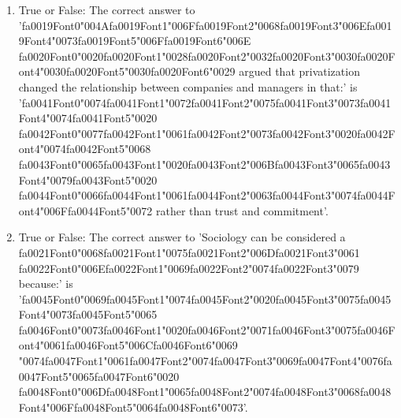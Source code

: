 \documentclass[12pt]{article}
\begin{document}
\begin{enumerate}[label=\arabic*.]
\item True or False: The correct answer to '{\csname fa0019Font0\endcsname\char"004A}{\csname fa0019Font1\endcsname\char"006F}{\csname fa0019Font2\endcsname\char"0068}{\csname fa0019Font3\endcsname\char"006E}{\csname fa0019Font4\endcsname\char"0073}{\csname fa0019Font5\endcsname\char"006F}{\csname fa0019Font6\endcsname\char"006E} {\csname fa0020Font0\endcsname\char"0020}{\csname fa0020Font1\endcsname\char"0028}{\csname fa0020Font2\endcsname\char"0032}{\csname fa0020Font3\endcsname\char"0030}{\csname fa0020Font4\endcsname\char"0030}{\csname fa0020Font5\endcsname\char"0030}{\csname fa0020Font6\endcsname\char"0029} argued that privatization changed the relationship between companies and managers in that:' is '{\csname fa0041Font0\endcsname\char"0074}{\csname fa0041Font1\endcsname\char"0072}{\csname fa0041Font2\endcsname\char"0075}{\csname fa0041Font3\endcsname\char"0073}{\csname fa0041Font4\endcsname\char"0074}{\csname fa0041Font5\endcsname\char"0020} {\csname fa0042Font0\endcsname\char"0077}{\csname fa0042Font1\endcsname\char"0061}{\csname fa0042Font2\endcsname\char"0073}{\csname fa0042Font3\endcsname\char"0020}{\csname fa0042Font4\endcsname\char"0074}{\csname fa0042Font5\endcsname\char"0068} {\csname fa0043Font0\endcsname\char"0065}{\csname fa0043Font1\endcsname\char"0020}{\csname fa0043Font2\endcsname\char"006B}{\csname fa0043Font3\endcsname\char"0065}{\csname fa0043Font4\endcsname\char"0079}{\csname fa0043Font5\endcsname\char"0020} {\csname fa0044Font0\endcsname\char"0066}{\csname fa0044Font1\endcsname\char"0061}{\csname fa0044Font2\endcsname\char"0063}{\csname fa0044Font3\endcsname\char"0074}{\csname fa0044Font4\endcsname\char"006F}{\csname fa0044Font5\endcsname\char"0072} rather than trust and commitment'.
\item True or False: The correct answer to 'Sociology can be considered a {\csname fa0021Font0\endcsname\char"0068}{\csname fa0021Font1\endcsname\char"0075}{\csname fa0021Font2\endcsname\char"006D}{\csname fa0021Font3\endcsname\char"0061} {\csname fa0022Font0\endcsname\char"006E}{\csname fa0022Font1\endcsname\char"0069}{\csname fa0022Font2\endcsname\char"0074}{\csname fa0022Font3\endcsname\char"0079} because:' is '{\csname fa0045Font0\endcsname\char"0069}{\csname fa0045Font1\endcsname\char"0074}{\csname fa0045Font2\endcsname\char"0020}{\csname fa0045Font3\endcsname\char"0075}{\csname fa0045Font4\endcsname\char"0073}{\csname fa0045Font5\endcsname\char"0065} {\csname fa0046Font0\endcsname\char"0073}{\csname fa0046Font1\endcsname\char"0020}{\csname fa0046Font2\endcsname\char"0071}{\csname fa0046Font3\endcsname\char"0075}{\csname fa0046Font4\endcsname\char"0061}{\csname fa0046Font5\endcsname\char"006C}{\csname fa0046Font6\endcsname\char"0069} {\char"0074}{\csname fa0047Font1\endcsname\char"0061}{\csname fa0047Font2\endcsname\char"0074}{\csname fa0047Font3\endcsname\char"0069}{\csname fa0047Font4\endcsname\char"0076}{\csname fa0047Font5\endcsname\char"0065}{\csname fa0047Font6\endcsname\char"0020} {\csname fa0048Font0\endcsname\char"006D}{\csname fa0048Font1\endcsname\char"0065}{\csname fa0048Font2\endcsname\char"0074}{\csname fa0048Font3\endcsname\char"0068}{\csname fa0048Font4\endcsname\char"006F}{\csname fa0048Font5\endcsname\char"0064}{\csname fa0048Font6\endcsname\char"0073}'.

\end{enumerate}
\end{document}
